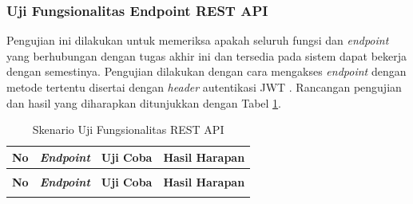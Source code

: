         \subsubsection{Uji Fungsionalitas Endpoint REST API}\label{ujifungsionalitasrestapi}
        	Pengujian ini dilakukan untuk memeriksa apakah seluruh fungsi dan \textit{endpoint} yang berhubungan dengan tugas akhir ini dan tersedia pada sistem dapat bekerja dengan semestinya. Pengujian dilakukan dengan cara mengakses \textit{endpoint} dengan metode tertentu disertai dengan \textit{header} autentikasi JWT . Rancangan pengujian dan hasil yang diharapkan ditunjukkan dengan Tabel \ref{ujirestapi}.
            
            \begin{longtable}{|p{}|p{}|p{}|p{}|}					\caption{Skenario Uji Fungsionalitas REST API} \label{ujirestapi} \\
            	\hline
            	\textbf{No} & \textbf{\textit{Endpoint}} & \textbf{Uji Coba} & \textbf{Hasil Harapan} \\ \hline
            	\endfirsthead
            	\caption[]{Skenario Uji Fungsionalitas REST API} \\
            	\hline
            	\textbf{No} & \textbf{\textit{Endpoint}} & \textbf{Uji Coba} & \textbf{Hasil Harapan} \\ \hline
            	\endhead
            	\endfoot
            	\endlastfoot
            	

\end{longtable}
